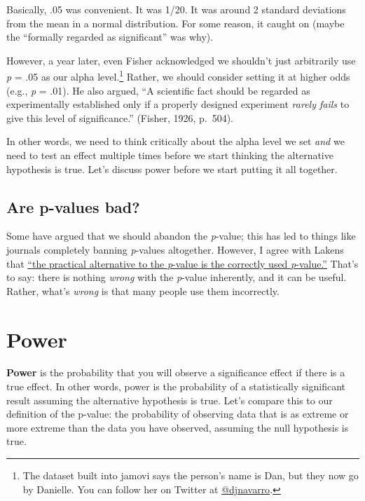 \documentclass[
]{book}
\begin{document}
Basically, .05 was convenient. It was 1/20. It was around 2 standard deviations from the mean in a normal distribution. For some reason, it caught on (maybe the ``formally regarded as significant'' was why).

However, a year later, even Fisher acknowledged we shouldn't just arbitrarily use \emph{p} = .05 as our alpha level.\footnote{The dataset built into jamovi says the person's name is Dan, but they now go by Danielle. You can follow her on Twitter at \href{https://twitter.com/djnavarro}{@djnavarro}.} Rather, we should consider setting it at higher odds (e.g., \emph{p} = .01). He also argued, ``A scientific fact should be regarded as experimentally established only if a properly designed experiment \emph{rarely fails} to give this level of significance.'' (Fisher, 1926, p.~504).

In other words, we need to think critically about the alpha level we set \emph{and} we need to test an effect multiple times before we start thinking the alternative hypothesis is true. Let's discuss power before we start putting it all together.

\hypertarget{are-p-values-bad}{%
\subsection{Are p-values bad?}\label{are-p-values-bad}}

Some have argued that we should abandon the \emph{p}-value; this has led to things like journals completely banning \emph{p}-values altogether. However, I agree with Lakens that \href{https://psyarxiv.com/shm8v/}{``the practical alternative to the \emph{p}-value is the correctly used \emph{p}-value.''} That's to say: there is nothing \emph{wrong} with the \emph{p}-value inherently, and it can be useful. Rather, what's \emph{wrong} is that many people use them incorrectly.

\hypertarget{power}{%
\section{Power}\label{power}}

\textbf{Power} is the probability that you will observe a significance effect if there is a true effect. In other words, power is the probability of a statistically significant result assuming the alternative hypothesis is true. Let's compare this to our definition of the p-value: the probability of observing data that is as extreme or more extreme than the data you have observed, assuming the null hypothesis is true.
\end{document}
